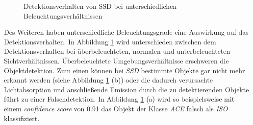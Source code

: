 \begin{figure}[H]
	\caption{Detektionsverhalten von SSD bei unterschiedlichen Beleuchtungsverhältnissen}
	\label{sicht}
\end{figure}

Des Weiteren haben unterschiedliche Beleuchtungsgrade eine Auswirkung auf das Detektionsverhalten. In Abbildung \ref{sicht} wird unterschieden zwischen dem Detektionsverhalten bei überbeleuchteten, normalen und unterbeleuchteten Sichtverhältnissen. Überbeleuchtete Umgebungsverhältnisse erschweren die Objektdetektion. Zum einen können bei \textit{SSD} bestimmte Objekte gar nicht mehr erkannt werden (siehe Abbildung \ref{sicht} (b)) oder die dadurch verursachte Lichtabsorption und anschließende Emission durch die zu detektierenden Objekte führt zu einer Falschdetektion. In Abbildung \ref{sicht} (a) wird so beispielsweise mit einem \textit{confidence score} von 0.91 das Objekt der Klasse \textit{ACE} falsch als \textit{ISO} klassifiziert.


